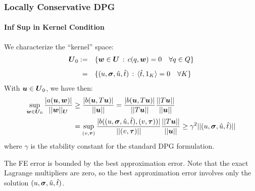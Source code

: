 \documentclass[18pt,xcolor=table]{beamer}
\begin{document}

\begin{frame}[noframenumbering]
\frametitle{Locally Conservative DPG}
\framesubtitle{Inf Sup in Kernel Condition}
We characterize the ``kernel'' space:
\begin{equation*}
\begin{array}
{rl}
\boldsymbol U_0  := & \{ \boldsymbol w \in \boldsymbol U \, : \, c(q,\boldsymbol w) = 0 \quad \forall q \in Q\} \\[8pt]
 = &\{ (u,\boldsymbol\sigma,\hat{u},\hat{t}) \, : \, \langle \hat{t},1_K \rangle = 0
 \quad \forall K \}
\end{array}
\end{equation*}
With $\boldsymbol u \in \boldsymbol U_0$, we have then:
\begin{align*}
   \sup_{\boldsymbol w \in \boldsymbol U_0} \frac{| a(\boldsymbol u,\boldsymbol w) |}{|| \boldsymbol w ||_{\boldsymbol U} }
   &\geq \frac{| b(\boldsymbol u,T \boldsymbol u) |}{|| \boldsymbol u ||}
   = \frac{| b(\boldsymbol u,T \boldsymbol u) |}{|| T\boldsymbol u ||}\frac{||T\boldsymbol u||}{||\boldsymbol u||}\\
   &= \sup_{(v,\boldsymbol\tau)}\frac{| b((u,\boldsymbol\sigma,\hat{u},\hat{t}), (v,\boldsymbol\tau)) |}{|| (v,\boldsymbol\tau) ||}
   \frac{||T\boldsymbol u||}{||\boldsymbol u||}
   \geq \gamma^2 || (u,\boldsymbol\sigma,\hat{u},\hat{t}) ||
\end{align*}
where $\gamma$ is the stability constant for the standard DPG formulation.

The FE error is bounded by the best approximation error. Note that the exact
Lagrange multipliers are zero, so the best approximation error involves only
the solution $(u,\boldsymbol\sigma,\hat{u},\hat{t})$.
\end{frame}

\end{document}
